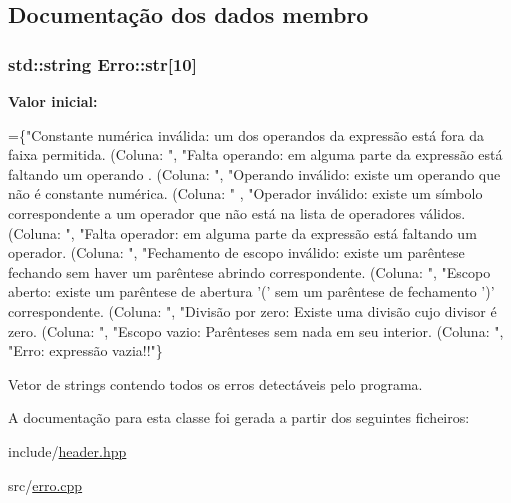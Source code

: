 \subsection{Documentação dos dados membro}
\hypertarget{class_erro_a88b4b69d608c3eba8aeaead2e6a78fcf}{
\subsubsection[{str}]{\setlength{\rightskip}{0pt plus 5cm}std\-::string Erro\-::str\mbox{[}10\mbox{]}\hspace{0.3cm}{\ttfamily [private]}}}\label{class_erro_a88b4b69d608c3eba8aeaead2e6a78fcf}
{\bfseries Valor inicial\-:}
\begin{DoxyCode}
=\{\textcolor{stringliteral}{"Constante numérica inválida: um dos operandos da expressão está fora da faixa permitida. (Coluna: "},
                            \textcolor{stringliteral}{"Falta operando: em alguma parte da expressão está faltando um operando .
       (Coluna: "},
                            \textcolor{stringliteral}{"Operando inválido: existe um operando que não é constante numérica. (Coluna: "}
      ,
                            \textcolor{stringliteral}{"Operador inválido: existe um símbolo correspondente a um operador que não está
       na lista de operadores válidos. (Coluna: "},
                            \textcolor{stringliteral}{"Falta operador: em alguma parte da expressão está faltando um operador.
       (Coluna: "},
                            \textcolor{stringliteral}{"Fechamento de escopo inválido: existe um parêntese fechando sem haver um
       parêntese abrindo correspondente. (Coluna: "},
                            \textcolor{stringliteral}{"Escopo aberto: existe um parêntese de abertura '(' sem um parêntese de
       fechamento ')' correspondente. (Coluna: "},
                            \textcolor{stringliteral}{"Divisão por zero: Existe uma divisão cujo divisor é zero. (Coluna: "},
                            \textcolor{stringliteral}{"Escopo vazio: Parênteses sem nada em seu interior. (Coluna: "},
                            \textcolor{stringliteral}{"Erro: expressão vazia!!"}\}
\end{DoxyCode}


Vetor de strings contendo todos os erros detectáveis pelo programa. 



A documentação para esta classe foi gerada a partir dos seguintes ficheiros\-:\begin{DoxyCompactItemize}
\item 
include/\hyperlink{header_8hpp}{header.\-hpp}\item 
src/\hyperlink{erro_8cpp}{erro.\-cpp}\end{DoxyCompactItemize}
